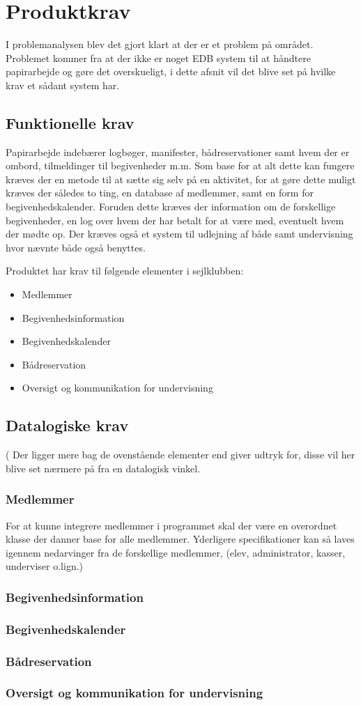 \chapter{Produktkrav}
I problemanalysen blev det gjort klart at der er et problem på området. Problemet kommer fra at der ikke er noget EDB
system til at håndtere papirarbejde og gøre det overskueligt, i dette afsnit vil det blive set på hvilke krav et sådant
system har.

\section{Funktionelle krav} \label{sec:funktionelleKrav}
Papirarbejde indebærer logbøger, manifester, bådreservationer samt hvem der er ombord, tilmeldinger til begivenheder m.m.
Som base for at alt dette kan fungere kræves der en metode til at sætte sig selv på en aktivitet, for at gøre dette
muligt kræves der således to ting, en database af medlemmer, samt en form for begivenhedskalender. Foruden dette kræves
der information om de forskellige begivenheder, en log over hvem der har betalt for at være med, eventuelt hvem der
mødte op. Der kræves også et system til udlejning af både samt undervisning hvor nævnte både også benyttes.

Produktet har krav til følgende elementer i sejlklubben:
\begin{itemize}
  \item Medlemmer
  \item Begivenhedsinformation
  \item Begivenhedskalender
  \item Bådreservation
  \item Oversigt og kommunikation for undervisning
\end{itemize}

\section{Datalogiske krav}(
Der ligger mere bag de ovenstående elementer end  giver udtryk for, disse vil her blive set nærmere på fra en datalogisk vinkel.
\subsection{Medlemmer}
For at kunne integrere medlemmer i programmet skal der være en overordnet klasse der danner base for alle medlemmer. Yderligere specifikationer kan så laves igennem nedarvinger fra de forskellige medlemmer, (elev, administrator, kasser, underviser o.lign.)
\subsection{Begivenhedsinformation}

\subsection{Begivenhedskalender}

\subsection{Bådreservation}

\subsection{Oversigt og kommunikation for undervisning}